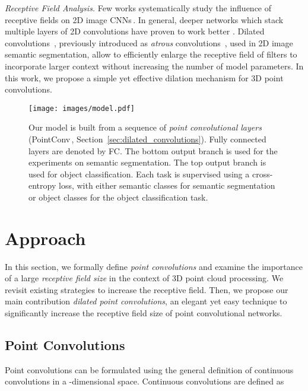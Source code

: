 \documentclass[letterpaper, 10 pt, conference]{ieeeconf}
\newcommand{\refsec}[1]{Section~\ref{sec:#1}}
\newcommand{\parag}[1]{\vspace{0ex} \textit{#1}}
\newcommand{\colorsquare}[1]{{\color{#1}}\hspace{-2.2mm}}
\begin{document}
\parag{Receptive Field Analysis.} Few works systematically study the influence of receptive fields on 2D image CNNs\,\cite{Luo16NIPS, Mishkin17CVIU}.
In general, deeper networks which stack multiple layers of 2D convolutions have proven to work better \cite{Simonyan15ICLR, Szegedy15CVPR}.
Dilated convolutions~\cite{Yu16ICLR}, previously introduced as \emph{atrous} convolutions~\cite{Chen15ICLR}, used in 2D image semantic segmentation, allow to efficiently enlarge the receptive field of filters to incorporate larger context without increasing the number of model parameters.
In this work, we propose a simple yet effective dilation mechanism for 3D point convolutions. 
\begin{figure*}
\begin{center}
\rule{0pt}{1ex}
\hspace{2.24mm}
\texttt{[image: images/model.pdf]}
\vspace{-20px}
\end{center}
   \caption{Our model is built from a sequence of \emph{point convolutional layers} (PointConv\,\colorsquare{M_PointConv}, \refsec{dilated_convolutions}).
   Fully connected layers are denoted by FC.
   The bottom output branch \colorsquare{M_SemSeg} is used for the experiments on semantic segmentation.
   The top output branch \colorsquare{M_Class} is used for object classification.
   Each task is supervised using a cross-entropy loss, with either  semantic classes for semantic segmentation or  object classes for the object classification task.}
\label{fig:model}
\end{figure*}
\section{Approach}
\label{sec:method}
In this section, we formally define \emph{point convolutions} and examine the importance of a large \emph{receptive field size} in the context of 3D point cloud processing.
We revisit existing strategies to increase the receptive field.
Then, we propose our main contribution \emph{dilated point convolutions}, an elegant yet easy technique to significantly increase the receptive field size of point convolutional networks.

\subsection{Point Convolutions}
Point convolutions can be formulated using the general definition of continuous convolutions in a -dimensional space.
Continuous convolutions are defined as
\end{document}
